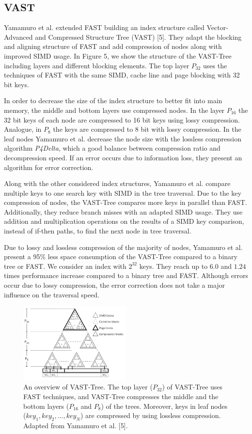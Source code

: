 \documentclass[conference]{IEEEtran}
\begin{document}
\subsection{VAST}\label{SCM}
Yamamuro et al. extended FAST building an index structure called Vector-Advanced and Compressed Structure Tree (VAST) [5]. They adapt the blocking and aligning structure of FAST and add compression of nodes along with improved SIMD usage. In Figure 5, we show the structure of the VAST-Tree including layers and different blocking elements. The top layer $P_{32}$ uses the techniques of FAST with the same SIMD, cache line and page blocking with 32 bit keys.

In order to decrease the size of the index structure to better fit into main memory, the middle and bottom layers use compressed nodes. In the layer $P_{16}$ the 32 bit keys of each node are compressed to 16 bit keys using lossy compression. Analogue, in $P_8$ the keys are compressed to 8 bit with lossy compression. In the leaf nodes Yamamuro et al. decrease the node size with the lossless compression algorithm \emph{P4Delta}, which a good balance between compression ratio and decompression speed. If an error occurs due to information loss, they present an algorithm for error correction.

Along with the other considered index structures, Yamamuro et al. compare multiple keys to one search key with SIMD in the tree traversal. Due to the key compression of nodes, the VAST-Tree compares more keys in parallel than FAST. Additionally, they reduce branch misses with an adapted SIMD usage. They use addition and multiplication operations on the results of a SIMD key comparison, instead of if-then paths, to find the next node in tree traversal.

Due to lossy and lossless compression of the majority of nodes, Yamamuro et al. present a 95\% less space consumption of the VAST-Tree compared to a binary tree or FAST. We consider an index with $2^{32}$ keys. They reach up to $6.0$ and $1.24$ times performance increase compared to a binary tree and FAST. Although errors occur due to lossy compression, the error correction does not take a major influence on the traversal speed.

\begin{figure}
	\includegraphics[width=0.5\textwidth]{figure_5.png}
	\caption{An overview of VAST-Tree. The top layer ($P_{32}$) of VAST-Tree uses FAST techniques, and VAST-Tree compresses the middle and the bottom layers ($P_{16}$ and $P_8$) of the trees. Moreover, keys in leaf nodes ($key_1, key_2, ...,	key_N$) are compressed by using lossless compression. Adapted from Yamamuro et al. [5].}
	\label{fig}
\end{figure}
\end{document}
